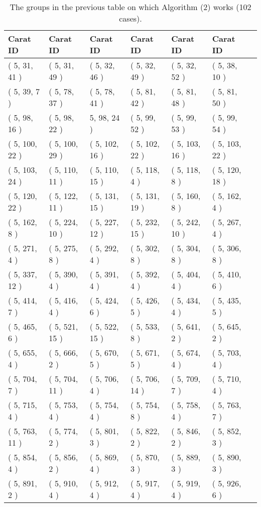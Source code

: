 \begin{table}
\begin{tabular}{lllllll}
Carat ID & Carat ID & Carat ID & Carat ID & Carat ID & Carat ID  \\
\hline
( 5, 31, 41 ) & ( 5, 31, 49 ) & ( 5, 32, 46 ) & ( 5, 32, 49 ) & ( 5, 32, 52 ) & ( 5, 38, 10 ) \\
 ( 5, 39, 7 ) &( 5, 78, 37 ) & ( 5, 78, 41 ) & ( 5, 81, 42 )& ( 5, 81, 48 ) & ( 5, 81, 50 ) \\
  ( 5, 98, 16 ) & ( 5, 98, 22 ) & 5, 98, 24 ) & ( 5, 99, 52 ) & ( 5, 99, 53 ) & ( 5, 99, 54 ) \\
   ( 5, 100, 22 ) & ( 5, 100, 29 )&  ( 5, 102, 16 ) & ( 5, 102, 22 ) & ( 5, 103, 16 ) & ( 5, 103, 22 )\\
    ( 5, 103, 24 ) & ( 5, 110, 11 ) & ( 5, 110, 15 ) & ( 5, 118, 4 ) & ( 5, 118, 8 )&  ( 5, 120, 18 ) \\
     ( 5, 120, 22 ) & ( 5, 122, 11 ) & ( 5, 131, 15 ) & ( 5, 131, 19 ) & ( 5, 160, 8 ) & ( 5, 162, 4 ) \\
      ( 5, 162, 8 ) & ( 5, 224, 10 )& ( 5, 227, 12 ) & ( 5, 232, 15 ) & ( 5, 242, 10 ) & ( 5, 267, 4 ) \\
( 5, 271, 4 ) & ( 5, 275, 8 ) & ( 5, 292, 4 ) & ( 5, 302, 8 ) & ( 5, 304, 8 )& ( 5, 306, 8 ) \\
 ( 5, 337, 12 ) &( 5, 390, 4 ) & ( 5, 391, 4 ) & ( 5, 392, 4 ) & ( 5, 404, 4 ) & ( 5, 410, 6 ) \\
  ( 5, 414, 7 ) & ( 5, 416, 4 ) & ( 5, 424, 6 )&  ( 5, 426, 5 ) & ( 5, 434, 4 ) & ( 5, 435, 5 ) \\
   ( 5, 465, 6 ) & ( 5, 521, 15 ) & ( 5, 522, 15 ) & ( 5, 533, 8 ) & ( 5, 641, 2 ) & ( 5, 645, 2 ) \\
    ( 5, 655, 4 )& ( 5, 666, 2 ) & ( 5, 670, 5 ) & ( 5, 671, 5 ) & ( 5, 674, 4 ) & ( 5, 703, 4 ) \\
     ( 5, 704, 7 ) & ( 5, 704, 11 ) & ( 5, 706, 4 ) & ( 5, 706, 14 ) & ( 5, 709, 7 )& ( 5, 710, 4 ) \\
      ( 5, 715, 4 ) & ( 5, 753, 4 ) & ( 5, 754, 4 ) & ( 5, 754, 8 ) & ( 5, 758, 4 ) & ( 5, 763, 7 ) \\
( 5, 763, 11 ) & ( 5, 774, 2 ) & ( 5, 801, 3 )& ( 5, 822, 2 ) & ( 5, 846, 2 ) & ( 5, 852, 3 ) \\
 ( 5, 854, 4 ) & ( 5, 856, 2 ) & ( 5, 869, 4 ) & ( 5, 870, 3 ) & ( 5, 889, 3 ) & ( 5, 890, 3 ) \\
  ( 5, 891, 2 )& ( 5, 910, 4 ) & ( 5, 912, 4 ) & ( 5, 917, 4 ) & ( 5, 919, 4 ) & ( 5, 926, 6 ) 
\end{tabular}
\caption{The groups in the previous table on which Algorithm (2) works (102 cases).}
\end{table}
